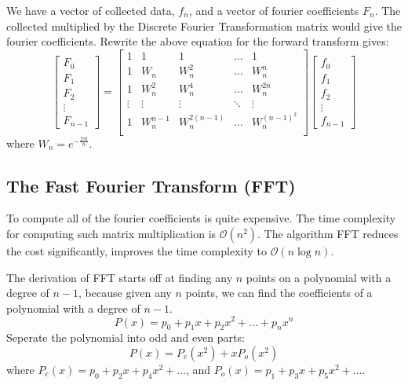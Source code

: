 \documentclass[12pt]{article}
\begin{document}
We have a vector of collected data, $f_n$, and a vector of fourier coefficients $F_n$. 
The collected multiplied by the Discrete Fourier Transformation matrix would give the fourier coefficients. 
Rewrite the above equation for the forward transform gives:
\begin{equation}
    \begin{bmatrix}
        F_0 \\  F_1 \\ F_2  \\  \vdots \\   F_{n-1}
    \end{bmatrix}
    =
    \begin{bmatrix}
        1   &   1           &   1               &   \dots   &   1               \\
        1   &   W_n         &   W_n^2           &   \dots   &   W_n^n           \\
        1   &   W_n^2       &   W_n^4           &   \dots   &   W_n^{2n}        \\
        \vdots & \vdots     &   \vdots          &   \ddots  &   \vdots          \\
        1   &   W_n^{n-1}   &   W_n^{2(n-1)}    &   \dots   &   W_n^{(n-1)^2}   \\
    \end{bmatrix}
    \begin{bmatrix}
        f_0 \\  f_1 \\ f_2  \\  \vdots \\   f_{n-1}
    \end{bmatrix}
    \label{equ:DFT_matrix}
\end{equation}
where $W_n = e^{-\frac{2\pi\mathrm{i}}{n}}$.


\subsection{The Fast Fourier Transform (FFT)}
To compute all of the fourier coefficients is quite expensive. 
The time complexity for computing such matrix multiplication is $\mathcal{O}(n^2)$. 
The algorithm FFT reduces the cost significantly, improves the time complexity to $\mathcal{O}(n\log n)$. 

The derivation of FFT starts off at finding any $n$ points on a polynomial with a degree of $n-1$, 
because given any $n$ points, we can find the coefficients of a polynomial with a degree of $n-1$.
$$ P(x) = p_0 + p_1x + p_2x^2 + \dots + p_nx^n $$
Seperate the polynomial into odd and even parts:
$$ P(x) = P_e(x^2) + xP_o(x^2) $$
where $P_e(x) = p_0 + p_2x + p_4x^2 + \dots $, and $P_o(x) = p_1 + p_3x + p_5x^2 + \dots $. 
\end{document}
